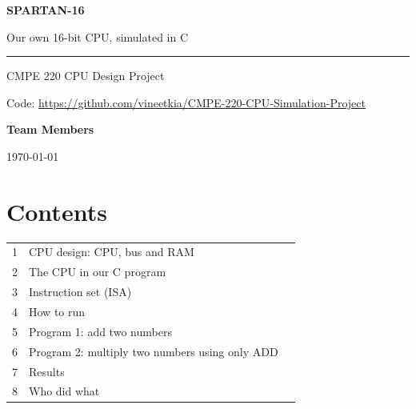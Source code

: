 \documentclass[10pt]{article}
\begin{document}
\begin{titlepage}
\thispagestyle{plain}
\centering
\vspace*{1.2in}
{\sffamily\bfseries\color{frame}\fontsize{38}{44}\selectfont SPARTAN-16\par}
\vspace{8pt}
{\sffamily\Large Our own 16-bit CPU, simulated in C\par}
\vspace{18pt}
{\color{frame}\rule{0.6\textwidth}{1pt}\par}
\vspace{18pt}
{\large CMPE 220 CPU Design Project\par}
\vspace{14pt}
{\normalsize Code: \url{https://github.com/vineetkia/CMPE-220-CPU-Simulation-Project}\par}
\vspace{0.9in}
{\sffamily\large\bfseries Team Members\par}
\vspace{8pt}
{\large \teamnames\par}
\vfill
{\large \today\par}
\vspace{0.4in}
\end{titlepage}
\setcounter{page}{2}

\section*{Contents}
\begin{tabularx}{\textwidth}{@{}lX r@{}}
\toprule
1 & CPU design: CPU, bus and RAM & \pageref{sec:cpu}\\
2 & The CPU in our C program & \pageref{sec:struct}\\
3 & Instruction set (ISA) & \pageref{sec:isa}\\
4 & How to run & \pageref{sec:run}\\
5 & Program 1: add two numbers & \pageref{sec:add}\\
6 & Program 2: multiply two numbers using only ADD & \pageref{sec:mul}\\
7 & Results & \pageref{sec:results}\\
8 & Who did what & \pageref{sec:team}\\
\bottomrule
\end{tabularx}
\end{document}
